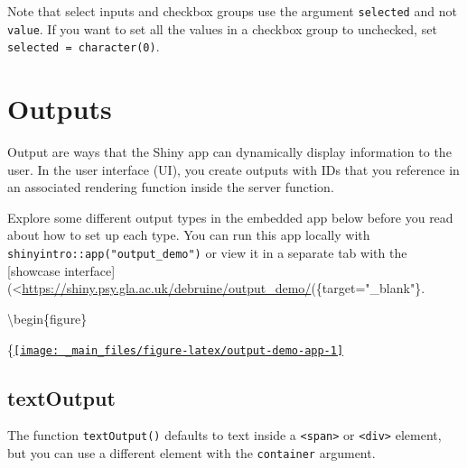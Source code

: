 \documentclass[
]{book}
\newenvironment{Shaded}{\begin{snugshade}}{\end{snugshade}}
\newcommand{\AttributeTok}[1]{\textcolor[rgb]{0.77,0.63,0.00}{#1}}
\newcommand{\CommentTok}[1]{\textcolor[rgb]{0.56,0.35,0.01}{\textit{#1}}}
\newcommand{\FunctionTok}[1]{\textcolor[rgb]{0.00,0.00,0.00}{#1}}
\newcommand{\NormalTok}[1]{#1}
\newcommand{\OtherTok}[1]{\textcolor[rgb]{0.56,0.35,0.01}{#1}}
\newcommand{\SpecialCharTok}[1]{\textcolor[rgb]{0.00,0.00,0.00}{#1}}
\newcommand{\StringTok}[1]{\textcolor[rgb]{0.31,0.60,0.02}{#1}}
\begin{document}
Note that select inputs and checkbox groups use the argument \texttt{selected} and not \texttt{value}. If you want to set all the values in a checkbox group to unchecked, set \texttt{selected\ =\ character(0)}.

\hypertarget{outputs}{%
\chapter{Outputs}\label{outputs}}

Output are ways that the Shiny app can dynamically display information to the user. In the user interface (UI), you create outputs with IDs that you reference in an associated rendering function inside the server function.

Explore some different output types in the embedded app below before you read about how to set up each type. You can run this app locally with \texttt{shinyintro::app("output\_demo")} or view it in a separate tab with the {[}showcase interface{]}(\textless{}\url{https://shiny.psy.gla.ac.uk/debruine/output_demo/}(\{target="\_blank"\}.

\textbackslash begin\{figure\}

\{\centering \href{https://shiny.psy.gla.ac.uk/debruine/output_demo/}{\texttt{[image: \_main\_files/figure-latex/output-demo-app-1]} }

\hypertarget{textoutput}{%
\section{textOutput}\label{textoutput}}

The function \texttt{textOutput()} defaults to text inside a \texttt{\textless{}span\textgreater{}} or \texttt{\textless{}div\textgreater{}} element, but you can use a different element with the \texttt{container} argument.

\begin{Shaded}
\end{Shaded}
\end{document}
